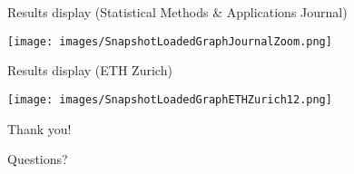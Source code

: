 \documentclass[aspectratio = 169, 15pt]{beamer}
\begin{document}
    \begin{frame}{Results display (Statistical Methods \& Applications Journal)}
        \begin{center}
            \vspace*{-0.83cm}
            \hspace*{-1.06cm}
            \texttt{[image: images/SnapshotLoadedGraphJournalZoom.png]}
        \end{center}
    \end{frame}
    
    \begin{frame}{Results display (ETH Zurich)}
        \begin{center}
            \vspace*{-0.83cm}
            \hspace*{-1.06cm}
            \texttt{[image: images/SnapshotLoadedGraphETHZurich12.png]}
        \end{center}
    \end{frame}
    
    \begin{frame}[standout]
        \normalfont
        \vspace*{2.25cm}
        \Huge Thank you!
        
        \vspace*{0.625cm}
        Questions?
        
        \vspace*{0.125cm}
        \begin{columns}[t]
            
                \centering\normalsize\break\myauthor
                
                \vspace*{-0.9cm}
                \begin{flushright}
                    \large\textbf{\textsc{\break\mydocumenttitle}}
                \end{flushright}
                
             \scriptsize\normalfont\break\mydocumentsubtitle
                
        \end{columns}
    \end{frame}
\end{document}
